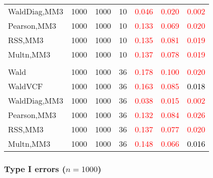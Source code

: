 \documentclass[
]{article}
\begin{document}
\begin{table}[H]
{\begin{tabular}[t]{lrrrrrr}
\hspace{1em}WaldDiag,MM3 & 1000 & 1000 & 10 & \textcolor{red}{0.046} & \textcolor{red}{0.020} & \textcolor{red}{0.002}\\
\hspace{1em}Pearson,MM3 & 1000 & 1000 & 10 & \textcolor{red}{0.133} & \textcolor{red}{0.069} & \textcolor{red}{0.020}\\
\hspace{1em}RSS,MM3 & 1000 & 1000 & 10 & \textcolor{red}{0.135} & \textcolor{red}{0.081} & \textcolor{red}{0.019}\\
\hspace{1em}Multn,MM3 & 1000 & 1000 & 10 & \textcolor{red}{0.137} & \textcolor{red}{0.078} & \textcolor{red}{0.019}\\
\addlinespace[0.3em]
\multicolumn{7}{l}{\textbf{3F 15V}}\\
\hspace{1em}Wald & 1000 & 1000 & 36 & \textcolor{red}{0.178} & \textcolor{red}{0.100} & \textcolor{red}{0.020}\\
\hspace{1em}WaldVCF & 1000 & 1000 & 36 & \textcolor{red}{0.163} & \textcolor{red}{0.085} & \textcolor{black}{0.018}\\
\hspace{1em}WaldDiag,MM3 & 1000 & 1000 & 36 & \textcolor{red}{0.038} & \textcolor{red}{0.015} & \textcolor{red}{0.002}\\
\hspace{1em}Pearson,MM3 & 1000 & 1000 & 36 & \textcolor{red}{0.132} & \textcolor{red}{0.084} & \textcolor{red}{0.026}\\
\hspace{1em}RSS,MM3 & 1000 & 1000 & 36 & \textcolor{red}{0.137} & \textcolor{red}{0.077} & \textcolor{red}{0.020}\\
\hspace{1em}Multn,MM3 & 1000 & 1000 & 36 & \textcolor{red}{0.148} & \textcolor{red}{0.066} & \textcolor{black}{0.016}\\
\bottomrule
\end{tabular}}
\endgroup{}
\end{table}

\hypertarget{type-i-errors-n1000-3}{%
\subsubsection{\texorpdfstring{Type I errors
(\(n=1000\))}{Type I errors (n=1000)}}\label{type-i-errors-n1000-3}}
\end{document}
